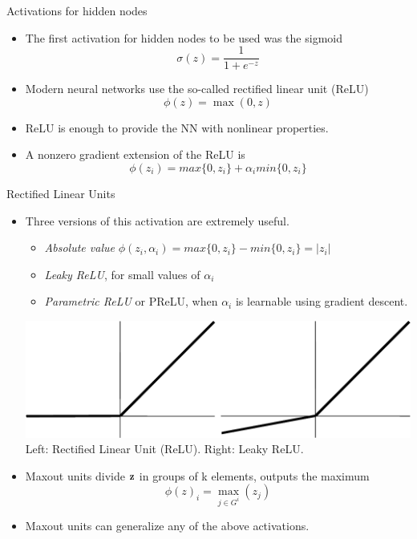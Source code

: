 \documentclass{beamer}
\begin{document}
\begin{frame}{Activations for hidden nodes}
\begin{itemize}
\item The first activation for hidden nodes to be used was the sigmoid $$
    \sigma(z)=\frac{1}{1+e^{-z}} 
$$
\item Modern neural networks use the so-called rectified linear unit (ReLU)
\begin{equation}
    \phi(z) = \max(0,z) 
\end{equation}
\item ReLU is enough to provide the NN with nonlinear properties. 
\item A nonzero gradient extension of the ReLU is 
\begin{equation}
\phi(z_i)=max\{0,z_i\} + \alpha_i min\{0,z_i\}
\end{equation}
\end{itemize}
\end{frame}



\begin{frame}{Rectified Linear Units}



\begin{itemize}
\item Three versions of this activation are extremely useful. 
\begin{itemize}
    \item \emph{Absolute value} $\phi(z_i,\alpha_i)=max\{0,z_i\}- min\{0,z_i\}=|z_i|$
    \item  \emph{Leaky ReLU}, for small values of $\alpha_i$
    \item   \emph{Parametric ReLU} or PReLU,  when $\alpha_i$ is learnable using gradient descent. 
\end{itemize}

\begin{center}
\includegraphics[scale=0.4]{Module 1 (NN)/pics/ReLU.pdf}\\
\tiny{Left: Rectified Linear Unit (ReLU). Right: Leaky ReLU.}
\end{center}
    

\item Maxout units  divide ${\bf z}$ in groups of k elements, outputs the maximum 
\begin{equation}
\phi(z)_i=\max_{j\in G^{i}}(z_j)
\end{equation}
\item Maxout units can generalize any of the above activations. 
\end{itemize}

\end{frame}
 
\end{document}
